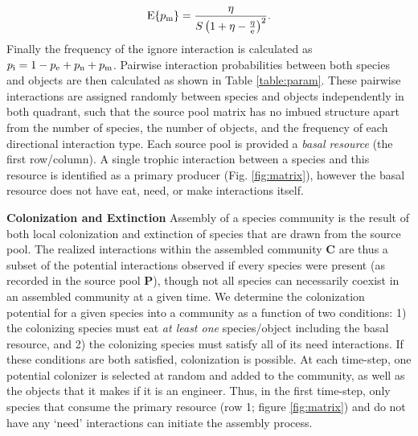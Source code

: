 \documentclass[twocolumn,preprintnumbers,amsmath,amssymb,superscriptaddress]{revtex4}
\newcommand{\rr}[1]{{\rm #1}}
\begin{document}
\begin{equation}
{\rm E}\{p_\rr{m}\} = \frac{\eta}{S\left(1 + \eta - \frac{\eta}{\rm e}\right)^2}.
\end{equation}
Finally the frequency of the ignore interaction is calculated as $p_\rr{i} = 1 - p_\rr{e} + p_\rr{n} + p_\rr{m}$.
Pairwise interaction probabilities between both species and objects are then calculated as shown in Table \ref{table:param}.
These pairwise interactions are assigned randomly between species and objects independently in both quadrant, such that the source pool matrix has no imbued structure apart from the number of species, the number of objects, and the frequency of each directional interaction type.
Each source pool is provided a \emph{basal resource} (the first row/column).
A single trophic interaction between a species and this resource is identified as a primary producer (Fig. \ref{fig:matrix}), however the basal resource does not have eat, need, or make interactions itself.


\textbf{Colonization and Extinction} Assembly of a species community is the result of both local colonization and extinction of species that are drawn from the source pool.
The realized interactions within the assembled community $\bm C$ are thus a subset of the potential interactions observed if every species were present (as recorded in the source pool $\bm P$), though not all species can necessarily coexist in an assembled community at a given time.
We determine the colonization potential for a given species into a community as a function of two conditions:
1) the colonizing species must eat \emph{at least one} species/object including the basal resource, and
2) the colonizing species must satisfy all of its need interactions.
If these conditions are both satisfied, colonization is possible.
At each time-step, one potential colonizer is selected at random and added to the community, as well as the objects that it makes if it is an engineer.
Thus, in the first time-step, only species that consume the primary resource (row 1; figure \ref{fig:matrix}) and do not have any `need' interactions can initiate the assembly process.

\end{document}
